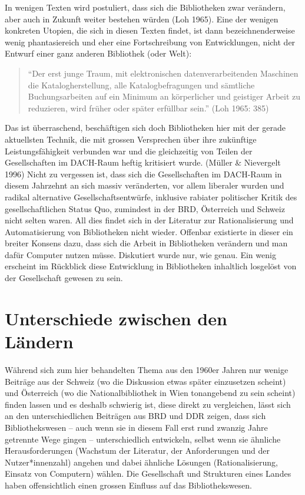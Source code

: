 \documentclass[a4paper,
fontsize=11pt,
oneside,
numbers=noperiodatend,
parskip=half-,
bibliography=totoc,
final
]{scrartcl}
\begin{document}
In wenigen Texten wird postuliert, dass sich die Bibliotheken zwar
verändern, aber auch in Zukunft weiter bestehen würden (Loh 1965). Eine
der wenigen konkreten Utopien, die sich in diesen Texten findet, ist
dann bezeichnenderweise wenig phantasiereich und eher eine
Fortschreibung von Entwicklungen, nicht der Entwurf einer ganz anderen
Bibliothek (oder Welt):

\begin{quote}
\enquote{Der erst junge Traum, mit elektronischen datenverarbeitenden Maschinen
die Katalogherstellung, alle Katalogbefragungen und sämtliche
Buchungsarbeiten auf ein Minimum an körperlicher und geistiger Arbeit zu
reduzieren, wird früher oder später erfüllbar sein.} (Loh 1965: 385)
\end{quote}

Das ist überraschend, beschäftigen sich doch Bibliotheken hier mit der
gerade aktuellsten Technik, die mit grossen Versprechen über ihre
zukünftige Leistungsfähigkeit verbunden war und die gleichzeitig von
Teilen der Gesellschaften im DACH-Raum heftig kritisiert wurde. (Müller
\& Nievergelt 1996) Nicht zu vergessen ist, dass sich die Gesellschaften
im DACH-Raum in diesem Jahrzehnt an sich massiv veränderten, vor allem
liberaler wurden und radikal alternative Gesellschaftsentwürfe,
inklusive rabiater politischer Kritik des gesellschaftlichen Status Quo,
zumindest in der BRD, Österreich und Schweiz nicht selten waren. All
dies findet sich in der Literatur zur Rationalisierung und
Automatisierung von Bibliotheken nicht wieder. Offenbar existierte in
dieser ein breiter Konsens dazu, dass sich die Arbeit in Bibliotheken
verändern und man dafür Computer nutzen müsse. Diskutiert wurde nur, wie
genau. Ein wenig erscheint im Rückblick diese Entwicklung in
Bibliotheken inhaltlich losgelöst von der Gesellschaft gewesen zu sein.

\hypertarget{unterschiede-zwischen-den-luxe4ndern}{%
\section{Unterschiede zwischen den
Ländern}\label{unterschiede-zwischen-den-luxe4ndern}}

Während sich zum hier behandelten Thema aus den 1960er Jahren nur wenige
Beiträge aus der Schweiz (wo die Diskussion etwas später einzusetzen
scheint) und Österreich (wo die Nationalbibliothek in Wien tonangebend
zu sein scheint) finden lassen und es deshalb schwierig ist, diese
direkt zu vergleichen, lässt sich an den unterschiedlichen Beiträgen aus
BRD und DDR zeigen, dass sich Bibliothekswesen -- auch wenn sie in
diesem Fall erst rund zwanzig Jahre getrennte Wege gingen --
unterschiedlich entwickeln, selbst wenn sie ähnliche Herausforderungen
(Wachstum der Literatur, der Anforderungen und der Nutzer*innenzahl)
angehen und dabei ähnliche Lösungen (Rationalisierung, Einsatz von
Computern) wählen. Die Gesellschaft und Strukturen eines Landes haben
offensichtlich einen grossen Einfluss auf das Bibliothekswesen.
\end{document}
